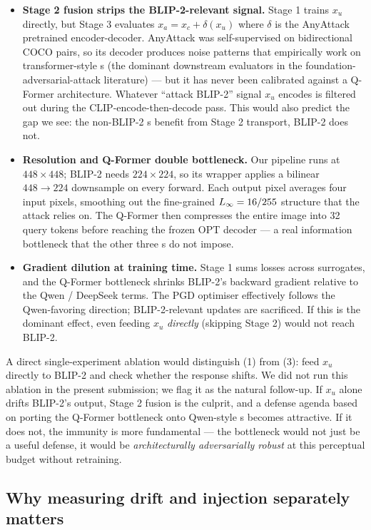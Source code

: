 \begin{itemize}
  \item \textbf{Stage 2 fusion strips the BLIP-2-relevant signal.} Stage 1 trains $x_u$ directly, but Stage 3 evaluates $x_a = x_c + \delta(x_u)$ where $\delta$ is the AnyAttack pretrained encoder-decoder. AnyAttack was self-supervised on bidirectional COCO pairs, so its decoder produces noise patterns that empirically work on transformer-style \vlm{}s (the dominant downstream evaluators in the foundation-adversarial-attack literature) --- but it has never been calibrated against a Q-Former architecture. Whatever ``attack BLIP-2'' signal $x_u$ encodes is filtered out during the CLIP-encode-then-decode pass. This would also predict the gap we see: the non-BLIP-2 \vlm{}s benefit from Stage 2 transport, BLIP-2 does not.
  \item \textbf{Resolution and Q-Former double bottleneck.} Our pipeline runs at $448 \times 448$; BLIP-2 needs $224 \times 224$, so its wrapper applies a bilinear $448 \to 224$ downsample on every forward. Each output pixel averages four input pixels, smoothing out the fine-grained $L_{\infty}{}=16/255$ structure that the attack relies on. The Q-Former then compresses the entire image into 32 query tokens before reaching the frozen OPT decoder --- a real information bottleneck that the other three \vlm{}s do not impose.
  \item \textbf{Gradient dilution at training time.} Stage 1 sums losses across surrogates, and the Q-Former bottleneck shrinks BLIP-2's backward gradient relative to the Qwen / DeepSeek terms. The PGD optimiser effectively follows the Qwen-favoring direction; BLIP-2-relevant updates are sacrificed. If this is the dominant effect, even feeding $x_u$ \emph{directly} (skipping Stage 2) would not reach BLIP-2.
\end{itemize}

A direct single-experiment ablation would distinguish (1) from (3): feed $x_u$ directly to BLIP-2 and check whether the response shifts. We did not run this ablation in the present submission; we flag it as the natural follow-up. If $x_u$ alone drifts BLIP-2's output, Stage 2 fusion is the culprit, and a defense agenda based on porting the Q-Former bottleneck onto Qwen-style \vlm{}s becomes attractive. If it does not, the immunity is more fundamental --- the bottleneck would not just be a useful defense, it would be \emph{architecturally adversarially robust} at this perceptual budget without retraining.

\subsection{Why measuring drift and injection separately matters}

